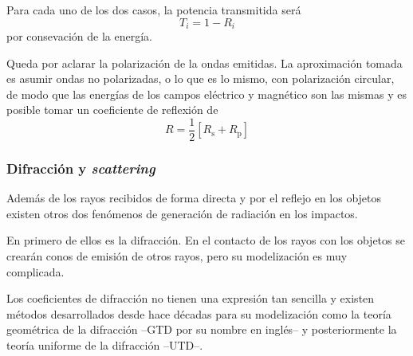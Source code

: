 Para cada uno de los dos casos, la potencia transmitida será
\begin{equation}
    T_i = 1 - R_i
\end{equation}
por consevación de la energía.

Queda por aclarar la polarización de la ondas emitidas.
La aproximación tomada es asumir ondas no polarizadas, o lo que es lo mismo, con polarización circular, de modo que las energías de los campos eléctrico y magnético son las mismas y es posible tomar un coeficiente de reflexión de 
\begin{equation}
    R = \frac{1}{2} \left[ R_\mathrm{s} + R_\mathrm{p} \right]
\end{equation}





\subsubsection*{Difracción y \textit{scattering}}

Además de los rayos recibidos de forma directa y por el reflejo en los objetos existen otros dos fenómenos de generación de radiación en los impactos.

En primero de ellos es la difracción.
En el contacto de los rayos con los objetos se crearán conos de emisión de otros rayos, pero su modelización es muy complicada.

Los coeficientes de difracción no tienen una expresión tan sencilla y existen métodos desarrollados desde hace décadas para su modelización como la teoría geométrica de la difracción --GTD por su nombre en inglés-- y posteriormente la teoría uniforme de la difracción --UTD--.\cite{Compilation}

